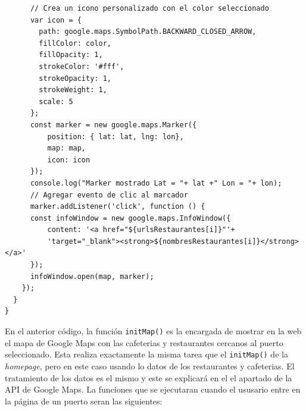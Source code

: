 \documentclass{article}
\begin{document}
\begin{verbatim}
      // Crea un icono personalizado con el color seleccionado
      var icon = {
        path: google.maps.SymbolPath.BACKWARD_CLOSED_ARROW,
        fillColor: color,
        fillOpacity: 1,
        strokeColor: '#fff',
        strokeOpacity: 1,
        strokeWeight: 1,
        scale: 5
      };
      const marker = new google.maps.Marker({
          position: { lat: lat, lng: lon},
          map: map,
          icon: icon
      });
      console.log("Marker mostrado Lat = "+ lat +" Lon = "+ lon);
      // Agregar evento de clic al marcador
      marker.addListener('click', function () {
      const infoWindow = new google.maps.InfoWindow({
          content: '<a href="${urlsRestaurantes[i]}"'+
          'target="_blank"><strong>${nombresRestaurantes[i]}</strong></a>'
      });
      infoWindow.open(map, marker);
    });
  }
}
\end{verbatim} 
En el anterior código, la función \texttt{initMap()} es la encargada de mostrar en la web el mapa de Google Maps con las cafeterias y restaurantes cercanos al puerto seleccionado. Esta realiza exactamente la misma tarea que el \texttt{initMap()} de la \textit{homepage}, pero en este caso usando lo datos de los restaurantes y cafeterias. El tratamiento de los datos es el mismo y este se explicará en el el apartado de la API de Google Maps. La funciones que se ejecutaran cuando el ususario entre en la página de un puerto seran las siguientes:
\end{document}
